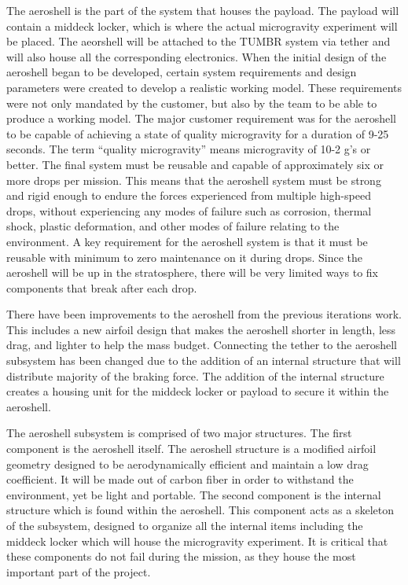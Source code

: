 \indent\indent The aeroshell is the part of the system that houses the payload. The payload will contain a middeck locker, which is where the actual microgravity experiment will be placed. The aeorshell will be attached to the TUMBR system via tether and will also house all the corresponding electronics. When the initial design of the aeroshell began to be developed, certain system requirements and design parameters were created to develop a realistic working model. These requirements were not only mandated by the customer, but also by the team to be able to produce a working model. The major customer requirement was for the aeroshell to be capable of achieving a state of quality microgravity for a duration of 9-25 seconds. The term “quality microgravity” means microgravity of 10-2 g’s or better. The final system must be reusable and capable of approximately six or more drops per mission. This means that the aeroshell system must be strong and rigid enough to endure the forces experienced from multiple high-speed drops, without experiencing any modes of failure such as corrosion, thermal shock, plastic deformation, and other modes of failure relating to the environment. A key requirement for the aeroshell system is that it must be reusable with minimum to zero maintenance on it during drops. Since the aeroshell will be up in the stratosphere, there will be very limited ways to fix components that break after each drop.

There have been improvements to the aeroshell from the previous iterations work. This includes a new airfoil design that makes the aeroshell shorter in length, less drag, and lighter to help the mass budget. Connecting the tether to the aeroshell subsystem has been changed due to the addition of an internal structure that will distribute majority of the braking force. The addition of the internal structure creates a housing unit for the middeck locker or payload to secure it within the aeroshell.

\indent\indent The aeroshell subsystem is comprised of two major structures. The first component is the aeroshell itself. The aeroshell structure is a modified airfoil geometry designed to be aerodynamically efficient and maintain a low drag coefficient. It will be made out of carbon fiber in order to withstand the environment, yet be light and portable. The second component is the internal structure which is found within the aeroshell. This component acts as a skeleton of the subsystem, designed to organize all the internal items including the middeck locker which will house the microgravity experiment. It is critical that these components do not fail during the mission, as they house the most important part of the project.

